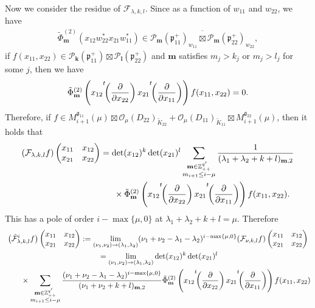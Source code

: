 \documentclass[pdftex]{sigma}
\numberwithin{equation}{section}
\newcommand{\bk}{\mathbf{k}}
\newcommand{\bl}{\mathbf{l}}
\newcommand{\bm}{\mathbf{m}}
\newcommand{\BZ}{\mathbb{Z}}
\newcommand{\fg}{\mathfrak{g}}
\newcommand{\fp}{\mathfrak{p}}
\newcommand{\cF}{\mathcal{F}}
\newcommand{\cO}{\mathcal{O}}
\newcommand{\cP}{\mathcal{P}}
\begin{document}
Now we consider the residue of $\cF_{\lambda,k,l}$. Since as a function of $w_{11}$ and $w_{22}$, we have
\begin{gather*} \tilde{\Phi}_\bm^{(2)} (x_{12}w_{22}^*x_{21}w_{11}^* )\in\overline{\cP_{\bm}(\fp^+_{11})_{w_{11}}\boxtimes\cP_{\bm}(\fp^+_{22})_{w_{22}}},\end{gather*}
if $f(x_{11},x_{22})\in\cP_\bk(\fp^+_{11})\boxtimes\cP_\bl(\fp^+_{22})$ and $\bm$ satisfies $m_j>k_j$ or $m_j>l_j$ for some $j$, then we have
\begin{gather*} \tilde{\Phi}_\bm^{(2)}
\left(x_{12}{\vphantom{\biggl(}}^t\!\!\left(\frac{\partial}{\partial x_{22}}\right)
x_{21}{\vphantom{\biggl(}}^t\!\!\left(\frac{\partial}{\partial x_{11}}\right)\right)f(x_{11},x_{22})=0. \end{gather*}
Therefore, if $f\in M_{i+1}^{\fg_{11}}(\mu)\boxtimes \cO_{\mu}(D_{22})_{\tilde{K}_{22}}
+\cO_{\mu}(D_{11})_{\tilde{K}_{11}}\boxtimes M_{i+1}^{\fg_{22}}(\mu)$, then it holds that
\begin{gather*}
(\cF_{\lambda,k,l}f)\begin{pmatrix}x_{11}&x_{12}\\x_{21}&x_{22}\end{pmatrix}
 =\det(x_{12})^k\det(x_{21})^l
\sum_{\substack{\bm\in\BZ_{++}^{q'}\\ m_{i+1}\le i-\mu}}\frac{1}{(\lambda_1+\lambda_2+k+l)_{\bm,2}}\\
\hphantom{(\cF_{\lambda,k,l}f)\begin{pmatrix}x_{11}&x_{12}\\x_{21}&x_{22}\end{pmatrix}=}{} \times\tilde{\Phi}_\bm^{(2)}
\left(x_{12}{\vphantom{\biggl(}}^t\!\!\left(\frac{\partial}{\partial x_{22}}\right)x_{21}
{\vphantom{\biggl(}}^t\!\!\left(\frac{\partial}{\partial x_{11}}\right)\right)f(x_{11},x_{22}).
\end{gather*}
This has a pole of order $i-\max\{\mu,0\}$ at $\lambda_1+\lambda_2+k+l=\mu$. Therefore
\begin{gather*}
 \big(\tilde{\cF}^i_{\lambda,k,l}f\big)\begin{pmatrix}x_{11}&x_{12}\\x_{21}&x_{22}\end{pmatrix}
:=\lim_{(\nu_1,\nu_2)\to(\lambda_1,\lambda_2)}(\nu_1+\nu_2-\lambda_1-\lambda_2)^{i-\max\{\mu,0\}}
(\cF_{\nu,k,l}f)\begin{pmatrix}x_{11}&x_{12}\\x_{21}&x_{22}\end{pmatrix} \\
{}=\lim_{(\nu_1,\nu_2)\to(\lambda_1,\lambda_2)}\det(x_{12})^k\det(x_{21})^l \\
\qquad{}\times
\sum_{\substack{\bm\in\BZ_{++}^{q'}\\ m_{i+1}\le i-\mu}}\frac{(\nu_1+\nu_2-\lambda_1-\lambda_2)^{i-\max\{\mu,0\}}}{(\nu_1+\nu_2+k+l)_{\bm,2}}
\tilde{\Phi}_\bm^{(2)}\left(x_{12}{\vphantom{\biggl(}}^t\!\!\left(\frac{\partial}{\partial x_{22}}\right)
x_{21}{\vphantom{\biggl(}}^t\!\!\left(\frac{\partial}{\partial x_{11}}\right)\right)f(x_{11},x_{22})
\end{gather*}
\end{document}

